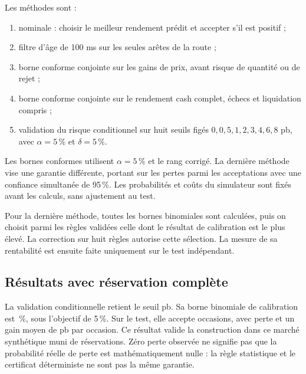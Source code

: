 Les méthodes sont :
\begin{enumerate}
\item nominale : choisir le meilleur rendement prédit et accepter s'il est positif ;
\item filtre d'âge de 100 ms sur les seules arêtes de la route ;
\item borne conforme conjointe sur les gains de prix, avant risque de quantité ou de rejet ;
\item borne conforme conjointe sur le rendement cash complet, échecs et liquidation compris ;
\item validation du risque conditionnel sur huit seuils figés \(0,0{,}5,1,2,3,4,6,8\) pb, avec \(\alpha=5\,\%\) et \(\delta=5\,\%\).
\end{enumerate}
Les bornes conformes utilisent \(\alpha=5\,\%\) et le rang corrigé. La dernière méthode vise une garantie différente, portant sur les pertes parmi les acceptations avec une confiance simultanée de 95\,\%. Les probabilités et coûts du simulateur sont fixés avant les calculs, sans ajustement au test.

Pour la dernière méthode, toutes les bornes binomiales sont calculées, puis on choisit parmi les règles validées celle dont le résultat de calibration est le plus élevé. La correction sur huit règles autorise cette sélection. La mesure de sa rentabilité est ensuite faite uniquement sur le test indépendant.

\subsection{Résultats avec réservation complète}

\begin{table}[H]\centering\small

\caption{Expérience 6, réservation de toute la route. Le gain moyen est un rendement simple en pb par occasion, incluant zéro en cas d'abstention. Les pertes sont des P\&L strictement négatifs. Chaque méthode voit les mêmes 600 épisodes.}
\label{tab:ext-reserved}
\end{table}

La validation conditionnelle retient le seuil \ExtConditionalThreshold{} pb. Sa borne binomiale de calibration est \ExtConditionalUpper{}\,\%, sous l'objectif de 5\,\%. Sur le test, elle accepte \ExtReservedAccept{} occasions, avec \ExtReservedLoss{} perte et un gain moyen de \ExtReservedMean{} pb par occasion. Ce résultat valide la construction dans ce marché synthétique muni de réservations. Zéro perte observée ne signifie pas que la probabilité réelle de perte est mathématiquement nulle : la règle statistique et le certificat déterministe ne sont pas la même garantie.

